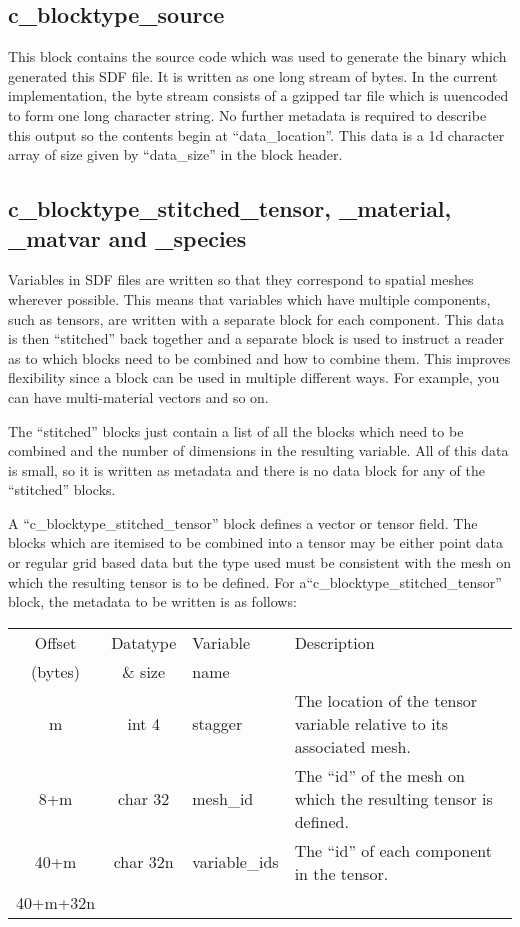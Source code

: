 \documentclass[12pt]{article}
\newcommand{\subsubsec}{\subsection}
\begin{document}
\subsubsec{c\_blocktype\_source}

This block contains the source code which was used to generate the binary
which generated this SDF file. It is written as one long stream of bytes.
In the current implementation, the byte stream consists of a gzipped
tar file which is uuencoded to form one long character string. No further
metadata is required to describe this output so the contents begin at
``data\_location''. This data is a 1d character array of size given by
``data\_size'' in the block header.


\subsubsec{c\_blocktype\_stitched\_tensor, \_material, \_matvar and \_species}

Variables in SDF files are written so that they correspond to spatial meshes
wherever possible. This means that variables which have multiple components,
such as tensors, are written with a separate block for each component. This
data is then ``stitched'' back together and a separate block is used to
instruct a reader as to which blocks need to be combined and how to combine
them. This improves flexibility since a block can be used in multiple different
ways. For example, you can have multi-material vectors and so on.

The ``stitched'' blocks just contain a list of all the blocks which need to
be combined and the number of dimensions in the resulting variable.
All of this data is small, so it is written as metadata and there is no
data block for any of the ``stitched'' blocks.

A ``c\_blocktype\_stitched\_tensor'' block defines a vector or tensor
field. The blocks which are itemised to be combined into a tensor
may be either point data or regular grid based data but the
type used must be consistent with the mesh on which the resulting tensor
is to be defined.
For a\linebreak ``c\_blocktype\_stitched\_tensor'' block, the metadata to be
written is as follows:\\

\begin{center}
\begin{tabularx}{0.9\textwidth}[!hbt]{cclX}
  Offset & Datatype & Variable & Description\\
  (bytes) & \& size & name &
  \\\toprule

  m & int 4 & stagger & The location of the tensor variable relative to
  its associated mesh.
  \\\midrule

  8+m & char 32 & mesh\_id & The ``id'' of the mesh on which the resulting
  tensor is defined.
  \\\midrule

  40+m & char 32n & variable\_ids & The ``id'' of each component in the tensor.
  \\\midrule

  40+m+32n &
\end{tabularx}
\end{center}\vspace{10pt}
\end{document}
